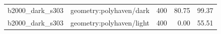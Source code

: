 \begin{longtable}{l>{\raggedright\arraybackslash}p{.42\linewidth}rrr}
b2000\_\allowbreak{}dark\_\allowbreak{}s303 & %
geometry:polyhaven/dark & %
400 & %
80.75 & %
99.37 \\ %

b2000\_\allowbreak{}dark\_\allowbreak{}s303 & %
geometry:polyhaven/light & %
400 & %
0.00 & %
55.51 \\ %


\end{longtable}
